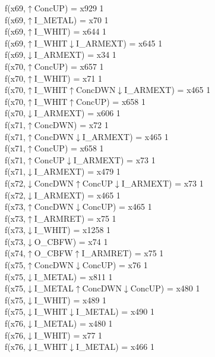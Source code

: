 f(x69,$\uparrow$ConcUP) = x929 {1} \\
f(x69,$\uparrow$I\_METAL) = x70 {1} \\
f(x69,$\uparrow$I\_WHIT) = x644 {1} \\
f(x69,$\uparrow$I\_WHIT$\downarrow$I\_ARMEXT) = x645 {1} \\
f(x69,$\downarrow$I\_ARMEXT) = x34 {1} \\
f(x70,$\uparrow$ConcUP) = x657 {1} \\
f(x70,$\uparrow$I\_WHIT) = x71 {1} \\
f(x70,$\uparrow$I\_WHIT$\uparrow$ConcDWN$\downarrow$I\_ARMEXT) = x465 {1} \\
f(x70,$\uparrow$I\_WHIT$\uparrow$ConcUP) = x658 {1} \\
f(x70,$\downarrow$I\_ARMEXT) = x606 {1} \\
f(x71,$\uparrow$ConcDWN) = x72 {1} \\
f(x71,$\uparrow$ConcDWN$\downarrow$I\_ARMEXT) = x465 {1} \\
f(x71,$\uparrow$ConcUP) = x658 {1} \\
f(x71,$\uparrow$ConcUP$\downarrow$I\_ARMEXT) = x73 {1} \\
f(x71,$\downarrow$I\_ARMEXT) = x479 {1} \\
f(x72,$\downarrow$ConcDWN$\uparrow$ConcUP$\downarrow$I\_ARMEXT) = x73 {1} \\
f(x72,$\downarrow$I\_ARMEXT) = x465 {1} \\
f(x73,$\uparrow$ConcDWN$\downarrow$ConcUP) = x465 {1} \\
f(x73,$\uparrow$I\_ARMRET) = x75 {1} \\
f(x73,$\downarrow$I\_WHIT) = x1258 {1} \\
f(x73,$\downarrow$O\_CBFW) = x74 {1} \\
f(x74,$\uparrow$O\_CBFW$\uparrow$I\_ARMRET) = x75 {1} \\
f(x75,$\uparrow$ConcDWN$\downarrow$ConcUP) = x76 {1} \\
f(x75,$\downarrow$I\_METAL) = x811 {1} \\
f(x75,$\downarrow$I\_METAL$\uparrow$ConcDWN$\downarrow$ConcUP) = x480 {1} \\
f(x75,$\downarrow$I\_WHIT) = x489 {1} \\
f(x75,$\downarrow$I\_WHIT$\downarrow$I\_METAL) = x490 {1} \\
f(x76,$\downarrow$I\_METAL) = x480 {1} \\
f(x76,$\downarrow$I\_WHIT) = x77 {1} \\
f(x76,$\downarrow$I\_WHIT$\downarrow$I\_METAL) = x466 {1} \\
